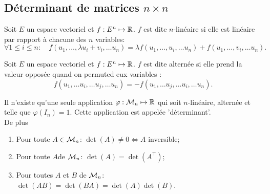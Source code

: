 \subsection{Déterminant de matrices $n \times n$} 

\begin{definition} \label{def:applicationNLineaire}
  Soit $E$ un espace vectoriel et $f: E^n \mapsto \mathbb{R}$. $f$ est dite $n$-linéaire si elle est linéaire par rapport à chacune des $n$ variables:
  $$
  \forall 1 \leq i \leq n: \quad
  f(u_1, \dots, \lambda u_i + v_i, \dots u_n) = \lambda f(u_1, \dots, u_i, \dots u_n) + f(u_1, \dots, v_i, \dots u_n).
  $$
\end{definition}

\begin{definition} \label{def:applicationAlternee}
  Soit $E$ un espace vectoriel et $f: E^n \mapsto \mathbb{R}$. $f$ est dite alternée si elle prend la valeur opposée quand on permuted eux variables : 
  $$
  f(u_1, \dots u_i, \dots u_j, \dots u_n)
  =
  - f(u_1, \dots u_j, \dots u_i, \dots u_n).
  $$
\end{definition}

\begin{theorem} \label{thm:uniciteDeterminant}
  Il n'existe qu'une seule application $\varphi: \mathcal{M}_n \mapsto \mathbb{R}$ qui soit $n$-linéaire, alternée et telle que $\varphi(I_n) = 1$. Cette application est appelée 'déterminant'. \\
  De plus
  \begin{enumerate}[($a$)]
   \item Pour toute $A \in \mathcal{M}_n$: $\det(A) \neq 0 \Leftrightarrow A$ inversible;
   \item Pour toute $A$de $\mathcal{M}_n$: $\det(A) = \det(A^\top)$;
   \item Pour toutes $A$ et $B$ de $\mathcal{M}_n$: $\det(A B) = \det(B A) = \det(A) \det(B)$.
  \end{enumerate}
\end{theorem}

